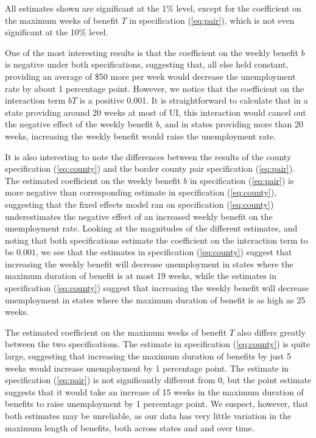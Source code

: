 \documentclass[12pt]{article}
\begin{document}
All estimates shown are significant at the 1\% level, except for the coefficient on the maximum weeks of benefit $T$ in specification (\ref{eq:pair}), which is not even significant at the 10\% level.

One of the most interesting results is that the coefficient on the weekly benefit $b$ is negative under both specifications, suggesting that, all else held constant, providing an average of \$50 more per week would decrease the unemployment rate by about 1 percentage point. However, we notice that the coefficient on the interaction term $bT$ is a positive 0.001. It is straightforward to calculate that in a state providing around 20 weeks at most of UI, this interaction would cancel out the negative effect of the weekly benefit $b$, and in states providing more than 20 weeks, increasing the weekly benefit would raise the unemployment rate.

It is also interesting to note the differences between the results of the county specification (\ref{eq:county}) and the border county pair specification (\ref{eq:pair}). The estimated coefficient on the weekly benefit $b$ in specification (\ref{eq:pair}) is more negative than corresponding estimate in specification (\ref{eq:county}), suggesting that the fixed effects model ran on specification (\ref{eq:county}) underestimates the negative effect of an increased weekly benefit on the unemployment rate. Looking at the magnitudes of the different estimates, and noting that both specifications estimate the coefficient on the interaction term to be $0.001$, we see that the estimates in specification (\ref{eq:county}) suggest that increasing the weekly benefit will decrease unemployment in states where the maximum duration of benefit is at most 19 weeks, while the estimates in specification (\ref{eq:county}) suggest that increasing the weekly benefit will decrease unemployment in states where the maximum duration of benefit is as high as 25 weeks.

The estimated coefficient on the maximum weeks of benefit $T$ also differs greatly between the two specifications. The estimate in specification (\ref{eq:county}) is quite large, suggesting that increasing the maximum duration of benefits by just 5 weeks would increase unemployment by 1 percentage point. The estimate in specification (\ref{eq:pair}) is not significantly different from 0, but the point estimate suggests that it would take an increase of 15 weeks in the maximum duration of benefits to raise unemployment by 1 percentage point. We suspect, however, that both estimates may be unreliable, as our data has very little variation in the maximum length of benefits, both across states and and over time.
\end{document}
